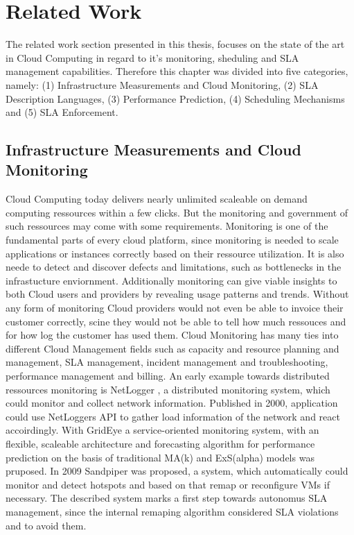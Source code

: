 
\chapter{Related Work} %
\label{Related Work} %
The related work section presented in this thesis, focuses on the state of the art in Cloud Computing in regard to it's monitoring, sheduling and SLA management capabilities. Therefore this chapter was divided into five categories, namely: (1) Infrastructure Measurements and Cloud Monitoring, (2) SLA Description Languages, (3) Performance Prediction, (4) Scheduling Mechanisms and (5) SLA Enforcement.

\section{Infrastructure Measurements and Cloud Monitoring}
Cloud Computing today delivers nearly unlimited scaleable on demand computing ressources within a few clicks. But the monitoring and government of such ressources may come with some requirements. Monitoring is one of the fundamental parts of every cloud platform, since monitoring is needed to scale applications or instances correctly based on their ressource utilization. It is also neede to detect and discover defects and limitations, such as bottlenecks in the infrastucture enviornment. Additionally monitoring can give viable insights to both Cloud users and providers by revealing usage patterns and trends. Without any form of monitoring Cloud providers would not even be able to invoice their customer correctly, scine they would not be able to tell how much ressouces and for how log the customer has used them. Cloud Monitoring has many ties into different Cloud Management fields such as capacity and resource planning and management, SLA management, incident management and troubleshooting, performance management and billing. An early example towards distributed ressources monitoring is NetLogger \cite{DBLP:conf/mascots/2000}, a distributed monitoring system, which could monitor and collect network information. Published in 2000, application could use NetLoggers API to gather load information of the network and react accoirdingly. With GridEye \cite{Fu:2006:GSG:1170138.1170724} a service-oriented monitoring system, with an flexible, scaleable architecture and forecasting algorithm for performance prediction on the basis of traditional MA(k) and ExS(alpha) models was pruposed. In 2009 Sandpiper \cite{Wood:2009:SBG:1663647.1663710} was proposed, a system, which automatically could monitor and detect hotspots and based on that remap or reconﬁgure VMs if necessary. The described system marks a first step towards autonomus SLA management, since the internal remaping algorithm considered SLA violations and to avoid them. 

